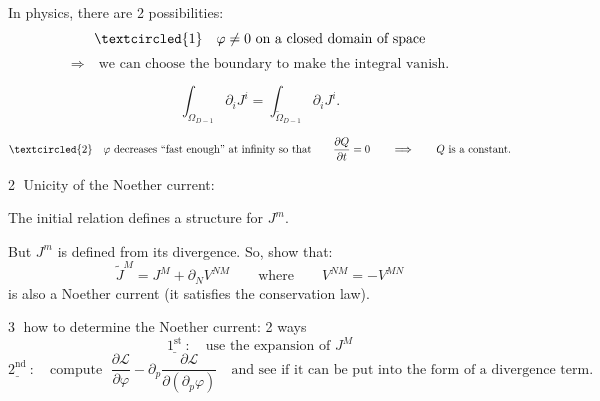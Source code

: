 \documentclass[11pt,a4paper]{article}
\begin{document}
In physics, there are 2 possibilities:
\[
\textcircled{1}\quad \varphi\neq0\ \text{on a closed domain of space}
\]
\[
\Longrightarrow\quad\text{we can choose the boundary to make the integral vanish.}
\]
\begin{center}
\end{center}
\[
\int_{\Omega_{D-1}}\partial_iJ^i
=\int_{\widetilde\Omega_{D-1}}\partial_iJ^i.
\]

\[
\textcircled{2}\quad \varphi\ \text{decreases ``fast enough'' at infinity so that}
\qquad \frac{\partial Q}{\partial t}=0
\qquad\Longrightarrow\qquad Q\ \text{is a constant}.
\]

\textcircled{2} \; Unicity of the Noether current:

The initial relation defines a structure for $J^m$.

But $J^m$ is defined from its divergence. So, show that:
\[
\widetilde J^M=J^M+\partial_NV^{NM}
\qquad\text{where}\qquad V^{NM}=-V^{MN}
\]
is also a Noether current (it satisfies the conservation law).

\textcircled{3} \; how to determine the Noether current: 2 ways
\[
\underline{1^{\mathrm{st}}}\ :\quad\text{use the expansion of }J^M
\]
\[
\underline{2^{\mathrm{nd}}}\ :\quad\text{compute }\;
\frac{\partial\mathcal L}{\partial\varphi}
-\partial_p\frac{\partial\mathcal L}{\partial(\partial_p\varphi)}
\quad\text{and see if it can be put into the form of a divergence term.}
\]
\end{document}

